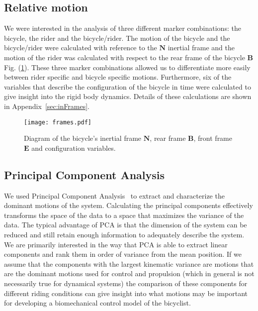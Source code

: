 \subsection{Relative motion}
\label{sec:relativeMotion}
We were interested in the analysis of three different marker combinations: the bicycle, the rider and the bicycle/rider. The motion of the bicycle and the bicycle/rider were calculated with reference to the $\mathbf{N}$ inertial frame and the motion of the rider was calculated with respect to the rear frame of the bicycle $\mathbf{B}$ Fig. (\ref{fig:frames}). These three marker combinations allowed us to differentiate more easily between rider specific and bicycle specific motions. Furthermore, six of the variables that describe the configuration of the bicycle in time were calculated to give insight into the rigid body dynamics. Details of these calculations are shown in Appendix~\ref{sec:inFrames}.
\begin{figure}[]
    \begin{center}
        \texttt{[image: frames.pdf]}
    \end{center}
    \caption{Diagram of the bicycle's inertial frame $\mathbf{N}$, rear frame $\mathbf{B}$, front frame $\mathbf{E}$ and configuration variables.}
    \label{fig:frames}
\end{figure}

\subsection{Principal Component Analysis}
\label{sec:pca}
We used Principal Component Analysis~\cite{Jolliffe2002} to extract and characterize the dominant motions of the system. Calculating the principal components effectively transforms the space of the data to a space that maximizes the variance of the data. The typical advantage of PCA is that the dimension of the system can be reduced and still retain enough information to adequately describe the system. We are primarily interested in the way that PCA is able to extract linear components and rank them in order of variance from the mean position. If we assume that the components with the largest kinematic variance are motions that are the dominant motions used for control and propulsion (which in general is not necessarily true for dynamical systems) the comparison of these components for different riding conditions can give insight into what motions may be important for developing a biomechanical control model of the bicyclist.

